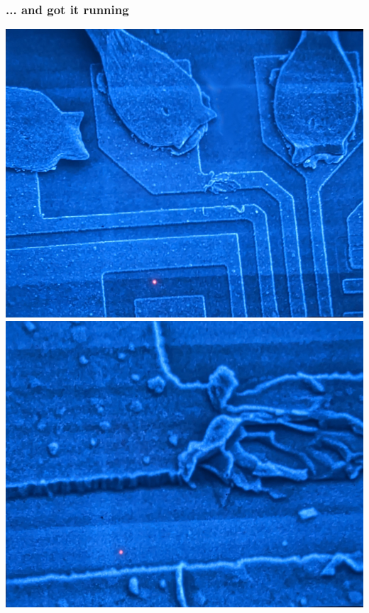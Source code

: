 \documentclass[aspectratio=169]{beamer}
\begin{document}
\begin{frame}
	\frametitle{... and got it running}

	\begin{center}
		\includegraphics[height=0.6\textheight]{sem-02.jpg}
		\includegraphics[height=0.6\textheight]{sem-03.jpg}
	\end{center}
\end{frame}
\end{document}
